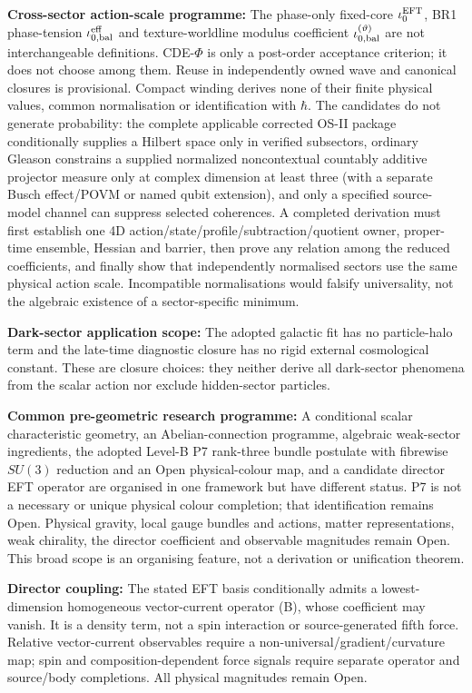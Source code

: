 \documentclass[11pt,a4paper]{article}
\begin{document}
\textbf{Cross-sector action-scale programme:} The phase-only fixed-core $\iota_0^{\rm EFT}$, BR1 phase-tension $\iota_{0,\rm bal}^{\rm eff}$ and texture-worldline modulus coefficient $\iota_{0,\rm bal}^{(\vartheta)}$ are not interchangeable definitions.  CDE-$\Phi$ is only a post-order acceptance criterion; it does not choose among them.  Reuse in independently owned wave and canonical closures is provisional.  Compact winding derives none of their finite physical values, common normalisation or identification with $\hbar$.  The candidates do not generate probability: the complete applicable corrected OS-II package conditionally supplies a Hilbert space only in verified subsectors, ordinary Gleason constrains a supplied normalized noncontextual countably additive projector measure only at complex dimension at least three (with a separate Busch effect/POVM or named qubit extension), and only a specified source-model channel can suppress selected coherences.  A completed derivation must first establish one 4D action/state/profile/subtraction/quotient owner, proper-time ensemble, Hessian and barrier, then prove any relation among the reduced coefficients, and finally show that independently normalised sectors use the same physical action scale.  Incompatible normalisations would falsify universality, not the algebraic existence of a sector-specific minimum.

\textbf{Dark-sector application scope:} The adopted galactic fit has no particle-halo term and the late-time diagnostic closure has no rigid external cosmological constant.  These are closure choices: they neither derive all dark-sector phenomena from the scalar action nor exclude hidden-sector particles.

\textbf{Common pre-geometric research programme:} A conditional scalar characteristic geometry, an Abelian-connection programme, algebraic weak-sector ingredients, the adopted Level-B P7 rank-three bundle postulate with fibrewise $SU(3)$ reduction and an Open physical-colour map, and a candidate director EFT operator are organised in one framework but have different status.  P7 is not a necessary or unique physical colour completion; that identification remains Open. Physical gravity, local gauge bundles and actions, matter representations, weak chirality, the director coefficient and observable magnitudes remain Open.  This broad scope is an organising feature, not a derivation or unification theorem.

\textbf{Director coupling:} The stated EFT basis conditionally admits a lowest-dimension homogeneous vector-current operator (B), whose coefficient may vanish.  It is a density term, not a spin interaction or source-generated fifth force.  Relative vector-current observables require a non-universal/gradient/curvature map; spin and composition-dependent force signals require separate operator and source/body completions.  All physical magnitudes remain Open.
\end{document}
